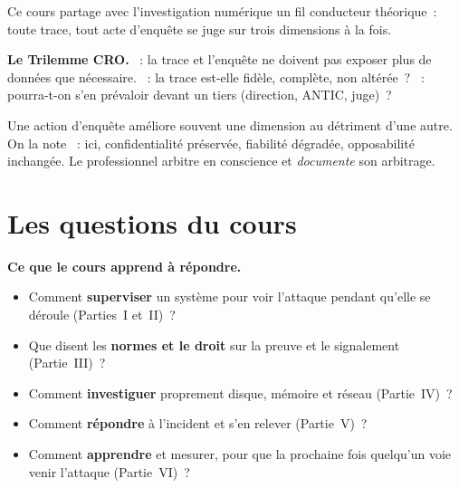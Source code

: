 Ce cours partage avec l'investigation numérique un fil conducteur théorique~:
toute trace, tout acte d'enquête se juge sur trois dimensions à la fois.

\begin{boxCRO}
\textbf{Le Trilemme CRO.} ~: la trace et l'enquête
ne doivent pas exposer plus de données que nécessaire. ~:
la trace est-elle fidèle, complète, non altérée~? ~:
pourra-t-on s'en prévaloir devant un tiers (direction, ANTIC, juge)~?

\smallskip
Une action d'enquête améliore souvent une dimension au détriment d'une autre.
On la note ~: ici, confidentialité préservée, fiabilité
dégradée, opposabilité inchangée. Le professionnel arbitre en conscience et
\emph{documente} son arbitrage.
\end{boxCRO}

\section{Les questions du cours}
\label{sec:p00-questions}

\begin{boxinfo}
\textbf{Ce que le cours apprend à répondre.}
\begin{itemize}
    \item Comment \textbf{superviser} un système pour voir l'attaque pendant
          qu'elle se déroule (Parties~I et~II)~?
    \item Que disent les \textbf{normes et le droit} sur la preuve et le
          signalement (Partie~III)~?
    \item Comment \textbf{investiguer} proprement disque, mémoire et réseau
          (Partie~IV)~?
    \item Comment \textbf{répondre} à l'incident et s'en relever (Partie~V)~?
    \item Comment \textbf{apprendre} et mesurer, pour que la prochaine fois
          quelqu'un voie venir l'attaque (Partie~VI)~?
\end{itemize}
\end{boxinfo}

\separateur

